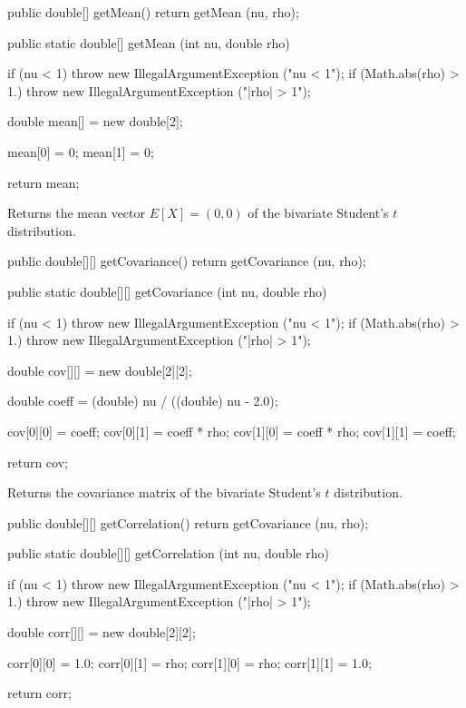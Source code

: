 \begin{code}\begin{hide}

   public double[] getMean() {
      return getMean (nu, rho);
   }\end{hide}

   public static double[] getMean (int nu, double rho)\begin{hide} {
      if (nu < 1)
         throw new IllegalArgumentException ("nu < 1");
      if (Math.abs(rho) > 1.)
         throw new IllegalArgumentException ("|rho| > 1");

      double mean[] = new double[2];

      mean[0] = 0;
      mean[1] = 0;

      return mean;
   }\end{hide}
\end{code}
\begin{tabb}
   Returns the mean vector $E[X] = (0, 0)$ of the bivariate Student's $t$ distribution.
\end{tabb}
\begin{code}\begin{hide}

   public double[][] getCovariance() {
      return getCovariance (nu, rho);
   }\end{hide}

   public static double[][] getCovariance (int nu, double rho)\begin{hide} {
      if (nu < 1)
         throw new IllegalArgumentException ("nu < 1");
      if (Math.abs(rho) > 1.)
         throw new IllegalArgumentException ("|rho| > 1");

      double cov[][] = new double[2][2];

      double coeff = (double) nu / ((double) nu - 2.0);

      cov[0][0] = coeff;
      cov[0][1] = coeff * rho;
      cov[1][0] = coeff * rho;
      cov[1][1] = coeff;

      return cov;
   }\end{hide}
\end{code}
\begin{tabb}
   Returns the covariance matrix of the bivariate Student's $t$ distribution.
\end{tabb}
\begin{code}\begin{hide}

   public double[][] getCorrelation() {
      return getCovariance (nu, rho);
   }\end{hide}

   public static double[][] getCorrelation (int nu, double rho)\begin{hide} {
      if (nu < 1)
         throw new IllegalArgumentException ("nu < 1");
      if (Math.abs(rho) > 1.)
         throw new IllegalArgumentException ("|rho| > 1");

      double corr[][] = new double[2][2];

      corr[0][0] = 1.0;
      corr[0][1] = rho;
      corr[1][0] = rho;
      corr[1][1] = 1.0;

      return corr;
   }\end{hide}
\end{code}
